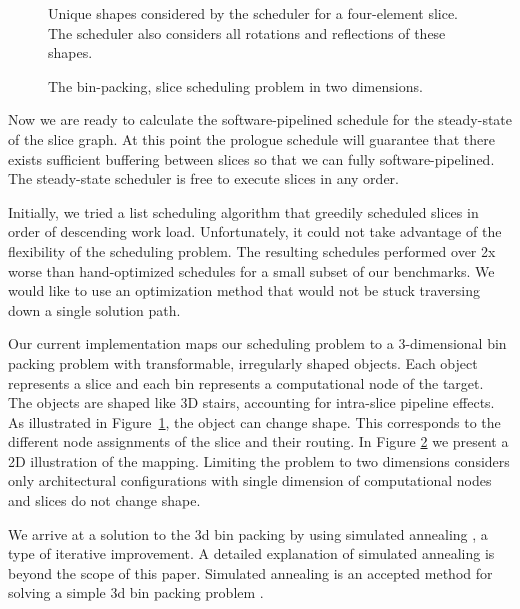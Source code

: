 \begin{figure}
\centering
{}
\vspace{-6pt}
\caption{Unique shapes considered by the scheduler for a four-element
slice.  The scheduler also considers all rotations and reflections of
these shapes.
\protect\label{fig:shapes}}
\end{figure}

\begin{figure}
\centering
{}
\vspace{-6pt}
\caption{The bin-packing, slice scheduling problem in two dimensions.
\protect\label{fig:2d}}
\end{figure}
Now we are ready to calculate the software-pipelined schedule for the
steady-state of the slice graph.  At this point the prologue schedule
will guarantee that there exists sufficient buffering between slices
so that we can fully software-pipelined. The steady-state scheduler is
free to execute slices in any order.

Initially, we tried a list scheduling algorithm that greedily
scheduled slices in order of descending work load. Unfortunately, it
could not take advantage of the flexibility of the scheduling problem.
The resulting schedules performed over 2x worse than hand-optimized
schedules for a small subset of our benchmarks. We would like to use
an optimization method that would not be stuck traversing down a
single solution path.

Our current implementation maps our scheduling problem to a
3-dimensional bin packing problem with transformable, irregularly
shaped objects.  Each object represents a slice and each bin
represents a computational node of the target.  The objects are shaped
like 3D stairs, accounting for intra-slice pipeline effects. As
illustrated in Figure~\ref{fig:shapes}, the object can change shape.
This corresponds to the different node assignments of the slice and
their routing.  In Figure \ref{fig:2d} we present a 2D illustration of
the mapping.  Limiting the problem to two dimensions considers only
architectural configurations with single dimension of computational
nodes and slices do not change shape.

We arrive at a solution to the 3d bin packing by using simulated
annealing \cite{simanneal}, a type of iterative improvement.  A
detailed explanation of simulated annealing is beyond the scope of
this paper.   Simulated annealing is an accepted method
for solving a simple 3d bin packing problem \cite{binpacking}. 

